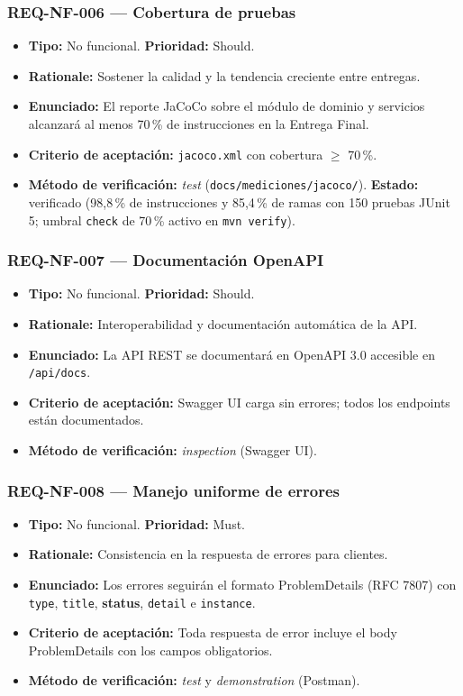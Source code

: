 \documentclass[12pt,a4paper]{article}
\begin{document}
\subsubsection{REQ-NF-006 — Cobertura de pruebas}
\begin{itemize}
  \item \textbf{Tipo:} No funcional. \textbf{Prioridad:} Should.
  \item \textbf{Rationale:} Sostener la calidad y la tendencia creciente entre entregas.
  \item \textbf{Enunciado:} El reporte JaCoCo sobre el módulo de dominio y servicios alcanzará
  al menos 70\,\% de instrucciones en la Entrega Final.
  \item \textbf{Criterio de aceptación:} \texttt{jacoco.xml} con cobertura \(\ge\) 70\,\%.
  \item \textbf{Método de verificación:} \textit{test} (\texttt{docs/mediciones/jacoco/}).
  \textbf{Estado:} verificado (98,8\,\% de instrucciones y 85,4\,\% de ramas con 150 pruebas
  JUnit 5; umbral \texttt{check} de 70\,\% activo en \texttt{mvn verify}).
\end{itemize}

\subsubsection{REQ-NF-007 — Documentación OpenAPI}
\begin{itemize}
  \item \textbf{Tipo:} No funcional. \textbf{Prioridad:} Should.
  \item \textbf{Rationale:} Interoperabilidad y documentación automática de la API.
  \item \textbf{Enunciado:} La API REST se documentará en OpenAPI 3.0 accesible en
  \texttt{/api/docs}.
  \item \textbf{Criterio de aceptación:} Swagger UI carga sin errores; todos los endpoints
  están documentados.
  \item \textbf{Método de verificación:} \textit{inspection} (Swagger UI).
\end{itemize}

\subsubsection{REQ-NF-008 — Manejo uniforme de errores}
\begin{itemize}
  \item \textbf{Tipo:} No funcional. \textbf{Prioridad:} Must.
  \item \textbf{Rationale:} Consistencia en la respuesta de errores para clientes.
  \item \textbf{Enunciado:} Los errores seguirán el formato ProblemDetails (RFC 7807)
  con \texttt{type}, \texttt{title}, \textbf{status}, \texttt{detail} e \texttt{instance}.
  \item \textbf{Criterio de aceptación:} Toda respuesta de error incluye el body ProblemDetails
  con los campos obligatorios.
  \item \textbf{Método de verificación:} \textit{test} y \textit{demonstration} (Postman).
\end{itemize}
\end{document}
